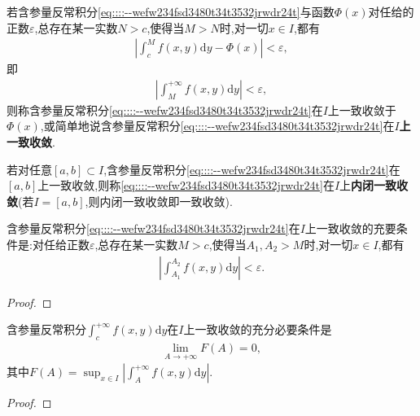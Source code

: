 \documentclass[../../main.tex]{subfiles}%
\begin{document}
\begin{definition}
若含参量反常积分\eqref{eq::::--wefw234fsd3480t34t3532jrwdr24t}与函数$\varPhi(x)$对任给的正数$\varepsilon$,总存在某一实数$N>c$,使得当$M>N$时,对一切$x\in I$,都有
\begin{align*}
\left| \int_{c}^{M}f(x,y)\mathrm{d}y - \varPhi(x) \right| < \varepsilon,
\end{align*}
即
\begin{align*}
\left| \int_{M}^{+\infty}f(x,y)\mathrm{d}y \right| < \varepsilon,
\end{align*}
则称含参量反常积分\eqref{eq::::--wefw234fsd3480t34t3532jrwdr24t}在$I$上一致收敛于$\varPhi(x)$,或简单地说含参量反常积分\eqref{eq::::--wefw234fsd3480t34t3532jrwdr24t}在$I$\textbf{上一致收敛}.

若对任意$[a,b]\subset I$,含参量反常积分\eqref{eq::::--wefw234fsd3480t34t3532jrwdr24t}在$[a,b]$上一致收敛,则称\eqref{eq::::--wefw234fsd3480t34t3532jrwdr24t}在$I$上\textbf{内闭一致收敛}(若$I=[a,b]$,则内闭一致收敛即一致收敛).
\end{definition}

\begin{theorem}[一致收敛的柯西准则]
含参量反常积分\eqref{eq::::--wefw234fsd3480t34t3532jrwdr24t}在$I$上一致收敛的充要条件是:对任给正数$\varepsilon$,总存在某一实数$M>c$,使得当$A_1,A_2>M$时,对一切$x\in I$,都有
\begin{align*}
\left| \int_{A_1}^{A_2}f(x,y)\mathrm{d}y \right| < \varepsilon. 
\end{align*}

\end{theorem}
\begin{proof}



\end{proof}

\begin{theorem}
含参量反常积分$\int_{c}^{+\infty}f(x,y)\mathrm{d}y$在$I$上一致收敛的充分必要条件是
\begin{align*}
\lim_{A \to +\infty}F(A)=0,
\end{align*}
其中$F(A)=\sup_{x\in I}\left| \int_{A}^{+\infty}f(x,y)\mathrm{d}y \right|$.
\end{theorem}
\begin{proof}



\end{proof}
\end{document}
